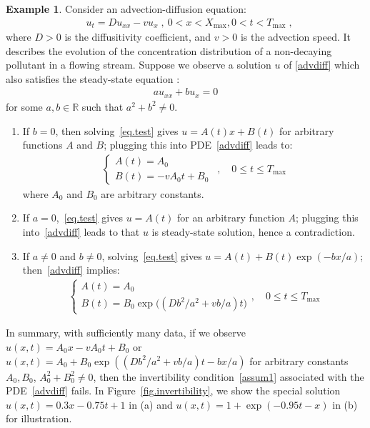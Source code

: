 \documentclass[a4paper,11pt]{article}
\theoremstyle{definition}
\newtheorem{example}{Example}[section]
\begin{document}
\begin{example}
Consider an advection-diffusion equation:
\begin{align}
&u_t=Du_{xx}-vu_x\;,~0<x<X_{\max},0<t<T_{\max}\;,\label{advdiff}
\end{align}
where $D>0$ is the diffusitivity coefficient, and $v>0$ is the advection speed. It describes the evolution of the concentration distribution of a non-decaying pollutant in a flowing stream. Suppose we observe a solution $u$ of \eqref{advdiff} which also satisfies the steady-state equation  :
\begin{align}
au_{xx}+bu_{x}=0\label{eq.test}	
\end{align}
for some $a,b\in\mathbb{R}$ such that $a^2+b^2\neq 0$.
\begin{enumerate}
\item If $b= 0$, then solving~\eqref{eq.test} gives $u=A(t)x+B(t)$ for arbitrary functions $A$ and $B$; plugging this into PDE~\eqref{advdiff} leads to:
\begin{align*}
\begin{cases}
A(t)=A_0\\
B(t) = -vA_0t+B_0\;
\end{cases}\,,\quad 0\leq t\leq T_{\max}
\end{align*}
where $A_0$ and $B_0$ are arbitrary constants.
\item If $a=0$,~\eqref{eq.test} gives $u=A(t)$ for an arbitrary function $A$; plugging this into~\eqref{advdiff} leads to  that $u$ is steady-state solution, hence a contradiction.
\item If $a\neq0$ and $b\neq 0$,  solving~\eqref{eq.test} gives $u=A(t)+B(t)\exp(-bx/a)$; then~\eqref{advdiff} implies:
\begin{align*}
\begin{cases}
A(t)=A_0\\
B(t)=B_0\exp\big((Db^2/a^2+vb/a)t\big)
\end{cases},\quad 0\leq t\leq T_{\max}%
\end{align*}
\end{enumerate}
In summary, with sufficiently many data, if we observe $u(x,t)=A_0x-vA_0t+B_0$ or $u(x,t)=A_0+B_0\exp((Db^2/a^2+vb/a)t-bx/a)$ for arbitrary constants $A_0,B_0$, $A_0^2+B_0^2\neq 0$, then the invertibility condition~\eqref{assum1} associated with the PDE~\eqref{advdiff} fails. In Figure~\ref{fig.invertibility}, we show the special solution $u(x,t)=0.3x-0.75t+1$ in (a) and $u(x,t)=1+\exp(-0.95t-x)$ in (b) for illustration.
\end{example}
\end{document}
